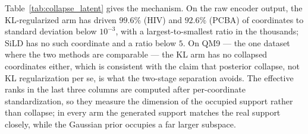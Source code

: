 \begin{table}[h]
\centering
\caption{%
Pipeline decomposition, 10K samples per cell, seed 42. (A) encode real
molecules and decode; (B) full latent-diffusion generation; (C) decode
$\mathcal N(0,I)$ samples directly. For the KL-regularized arm on HIV and
PCBA all three agree at near-zero uniqueness and IntDiv, identifying Stage~1
as the point of failure.%
}
\label{tab:collapse_abc}
\small
{}
\end{table}

Table~\ref{tab:collapse_latent} gives the mechanism. On the raw encoder
output, the KL-regularized arm has driven $99.6\%$ (HIV) and $92.6\%$ (PCBA)
of coordinates to standard deviation below $10^{-3}$, with a
largest-to-smallest ratio in the thousands; SiLD has no such coordinate and a
ratio below $5$. On QM9 --- the one dataset where the two methods are
comparable --- the KL arm has no collapsed coordinates either, which is
consistent with the claim that posterior collapse, not KL regularization per
se, is what the two-stage separation avoids. The effective ranks in the last
three columns are computed after per-coordinate standardization, so they
measure the dimension of the occupied support rather than collapse; in every
arm the generated support matches the real support closely, while the
Gaussian prior occupies a far larger subspace.

